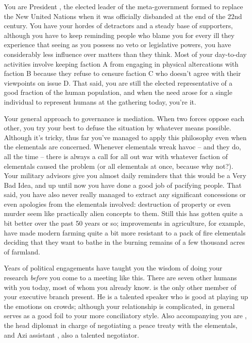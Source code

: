 \documentclass[char]{elementals}
\begin{document}
\name{\cLeader{}}

You are President \cLeader{\intro}, the elected leader of the meta-government formed to replace the New United Nations when it was officially disbanded at the end of the 22nd century. You have your hordes of detractors and a steady base of supporters, although you have to keep reminding people who blame you for every ill they experience that seeing as you possess no veto or legislative powers, you have considerably less influence over matters than they think. Most of your day-to-day activities involve keeping faction A from engaging in physical altercations with faction B because they refuse to censure faction C who doesn't agree with their viewpoints on issue D. That said, you are still the elected representative of a good fraction of the human population, and when the need arose for a single individual to represent humans at the gathering today, you're it.

Your general approach to governance is mediation. When two forces oppose each other, you try your best to defuse the situation by whatever means possible. Although it's tricky, thus far you've managed to apply this philosophy even when the elementals are concerned. Whenever elementals wreak havoc -- and they do, all the time -- there is always a call for all out war with whatever faction of elementals caused the problem (or all elementals at once, because why not?). Your military advisors give you almost daily reminders that this would be a Very Bad Idea, and up until now you have done a good job of pacifying people. That said, you have also never really managed to extract any significant concessions or even apologies from the elementals involved: destruction of property or even murder seem like practically alien concepts to them. Still this has gotten quite a bit better over the past 50 years or so; improvements in agriculture, for example, have made modern farming quite a bit more resistant to a pack of fire elementals deciding that they want to bathe in the burning remains of a few thousand acres of farmland.

Years of political engagements have taught you the wisdom of doing your research \emph{before} you come to a meeting like this. There are seven other humans with you today, most of whom you already know. \cDema{\intro} is the only other member of your executive branch present. He is a talented speaker who is good at playing up the emotions on crowds; although your relationship is complicated, in general \cDema{\they} serves as a good foil to your more conciliatory style. Also accompanying you are \cAvatar{\intro}, the head diplomat in charge of negotiating a peace treaty with the elementals, and \cAvatar{\their} Azi assistant \cDiplomat{\intro}, also a talented negotiator.
\end{document}
